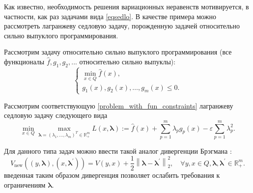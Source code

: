 Как известно, необходимость решения вариационных неравенств мотивируется, в частности, как раз задачами вида \eqref{eqsedlo}. В качестве примера можно рассмотреть лагранжеву седловую задачу, порожденную задачей относительно сильно выпуклого программирования.  
\begin{example} Рассмотрим задачу относительно сильно выпуклого программирования (все функционалы $\widehat{f}, g_1, g_2, ...$ относительно сильно выпуклы):
    \begin{equation}\label{problem_with_fun_constraints}
        \left\{\begin{array}{c}
        \min_{x \in Q} \widehat{f}(x), \\
        g_{1}(x), g_{2}(x), \ldots, g_{m}(x) \leq 0.
        \end{array}\right.
    \end{equation}
        
    Рассмотрим соответствующую \eqref{problem_with_fun_constraints} лагранжеву седловую задачу следующего вида
    \begin{equation}\label{lagrange_problem}
        \min_{x \in Q} \max_{ \boldsymbol{\lambda}= (\lambda_1, \ldots, \lambda_m)^T \in \mathbb{R}_+^m} L(x, \boldsymbol{\lambda}) :=  \widehat{f}(x) + \sum_{p=1}^{m} \lambda_p g_p(x) - \varepsilon \sum_{p=1}^m \lambda_{p}^2.
    \end{equation}
\end{example}
Для данного типа задач можно ввести такой аналог дивергенции Брэгмана \cite{Fedor_relative_adapuniv}:
$$
    V_{\text{new}}\left((y, \boldsymbol{\lambda}), (x, \boldsymbol{\lambda}^{'})\right) = V(y,x) + \frac{1}{2} \left\|\boldsymbol{\lambda} - \boldsymbol{\lambda}^{'}\right\|_2^2, \quad  \forall y, x \in Q, \boldsymbol{\lambda},  \boldsymbol{\lambda}^{'} \in \mathbb{R}_+^m.
$$
введенная таким образом дивергенция позволяет ослабить требования к ограничениям $\boldsymbol{\lambda}$.

